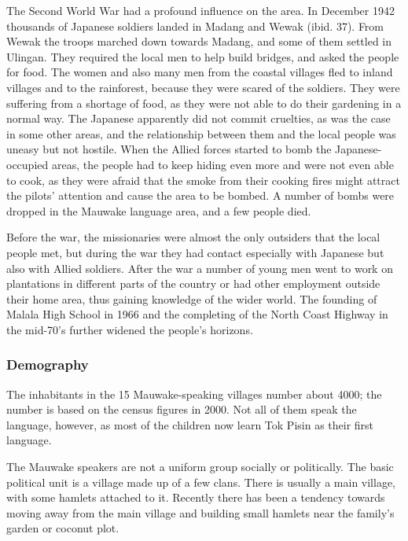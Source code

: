 The Second World War had a profound influence on the area.  In December 1942 thousands of Japanese soldiers landed in Madang and Wewak (ibid. 37).  From Wewak the troops marched down towards Madang, and some of them settled in Ulingan.  They required the local men to help build bridges, and asked the people for food.  The women and also many men from the coastal villages fled to inland villages and to the rainforest, because they were scared of the soldiers.  They were suffering from a shortage of food, as they were not able to do their gardening in a normal way.  The Japanese apparently did not commit cruelties, as was the case in some other areas, and the relationship between them and the local people was uneasy but not hostile. When the Allied forces started to bomb the Japanese-occupied areas, the people had to keep hiding even more and were not even able to cook, as they were afraid that the smoke from their cooking fires might attract the pilots' attention and cause the area to be bombed.  A number of bombs were dropped in the Mauwake language area, and a few people died. 

Before the war, the missionaries were almost the only outsiders that the local people met, but during the war they had contact especially with Japanese but also with Allied soldiers.  After the war a number of young men went to work on plantations in different parts of the country or had other employment outside their home area, thus gaining knowledge of the wider world. The founding of Malala High School in 1966 and the completing of the North Coast Highway in the mid-70's further widened the people's horizons.

\subsubsection{Demography}   \label{sec:1.3.3:demography} 
{\footnotemark}


The inhabitants in the 15 Mauwake-speaking villages number about 4000;  the number is based on the census figures in 2000.  Not all of them speak the language, however, as most of the children now learn Tok Pisin as their first language.


The Mauwake speakers are not a uniform group socially or politically. The basic political unit is a village made up of a few clans. There is usually a main village, with some hamlets attached to it.  Recently there has been a tendency towards moving away from the main village and building small hamlets near the family's garden or coconut plot. 

